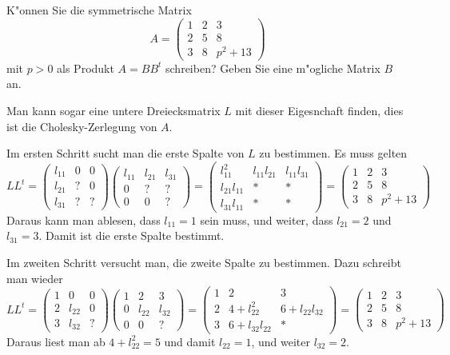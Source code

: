K"onnen Sie die symmetrische Matrix
\[
A=\begin{pmatrix}
 1&2&3\\
 2&5&8\\
 3&8&p^2 + 13
\end{pmatrix}
\]
mit $p>0$ als Produkt $A=BB^t$ schreiben?
Geben Sie eine m"ogliche Matrix $B$ an.

\begin{loesung}
Man kann sogar eine untere Dreiecksmatrix $L$ mit dieser Eigesnchaft finden,
dies ist die Cholesky-Zerlegung von $A$.

Im ersten Schritt sucht man die erste Spalte von $L$ zu bestimmen.
Es muss gelten
\[
LL^t=
\begin{pmatrix}
l_{11}&  0&  0\\
l_{21}&  ?&  0\\
l_{31}&  ?&  ?
\end{pmatrix}
\begin{pmatrix}
l_{11}&l_{21}&l_{31}\\
     0&     ?&     ?\\
     0&     0&     ?
\end{pmatrix}
=
\begin{pmatrix}
    l_{11}^2&l_{11}l_{21}&l_{11}l_{31}\\
l_{21}l_{11}&           *&           *\\
l_{31}l_{11}&           *&           *
\end{pmatrix}
=
\begin{pmatrix}
 1&2&3\\
 2&5&8\\
 3&8&p^2 + 13
\end{pmatrix}
\]
Daraus kann man ablesen, dass $l_{11}=1$ sein muss, und weiter,
dass
$l_{21}=2$ und $l_{31}=3$. Damit ist die erste Spalte bestimmt.

Im zweiten Schritt versucht man, die zweite Spalte zu bestimmen.
Dazu schreibt man wieder
\[
LL^t
=
\begin{pmatrix}
1&     0&0\\
2&l_{22}&0\\
3&l_{32}&?
\end{pmatrix}
\begin{pmatrix}
1&     2&     3\\
0&l_{22}&l_{32}\\
0&     0&?
\end{pmatrix}
=
\begin{pmatrix}
 1&              2&             3\\
 2& 4+l_{22}^2    & 6+l_{22}l_{32}\\
 3& 6+l_{32}l_{22}&             *
\end{pmatrix}
=
\begin{pmatrix}
 1&2&3\\
 2&5&8\\
 3&8&p^2 + 13
\end{pmatrix}
\]
Daraus liest man ab $4+l_{22}^2=5$ und damit $l_{22}=1$, und weiter
$l_{32}=2$.


\end{loesung}
